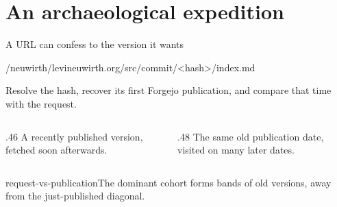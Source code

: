 \documentclass[aspectratio=169,11pt]{beamer}
\begin{document}
\section{An archaeological expedition}
\begin{frame}{A URL can confess to the version it wants}
  \medskip
  {\ttfamily\small /neuwirth/levineuwirth.org/src/commit/<hash>/index.md\par}
  \bigskip
  Resolve the hash, recover its first Forgejo publication, and compare
  that time with the request.\par\bigskip
  \begin{columns}[T,onlytextwidth]
    \begin{column}{.46\textwidth}
      A recently published version, fetched soon afterwards.
    \end{column}
    \begin{column}{.48\textwidth}
      The same old publication date, visited on many later dates.
    \end{column}
  \end{columns}
\end{frame}

  {request-vs-publication}{The dominant cohort forms bands of old versions, away from the just-published diagonal.}
\end{document}
